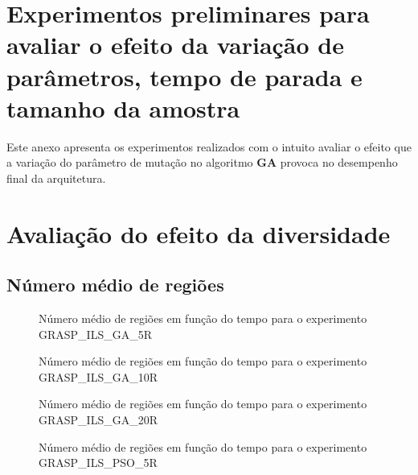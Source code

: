 \begin{apendicesenv}
\partapendices

\chapter{Experimentos preliminares para avaliar o efeito da variação de parâmetros, tempo de parada e tamanho da amostra}

Este anexo apresenta os experimentos realizados com o intuito avaliar o efeito que a variação do parâmetro de mutação no algoritmo \textbf{GA} provoca no desempenho final da arquitetura.

\chapter{Avaliação do efeito da diversidade}

\section{Número médio de regiões}
\label{app:numeroMedioRegioes}


\begin{figure}
    \centering
    \caption{Número médio de regiões em função do tempo para o experimento GRASP\_ILS\_GA\_5R}
    
    \label{grasp_ils_ga_5r}
\end{figure}

\begin{figure}
    \centering
    \caption{Número médio de regiões em função do tempo para o experimento GRASP\_ILS\_GA\_10R}
    
    \label{grasp_ils_ga_10R}
\end{figure}

\begin{figure}
    \centering
    \caption{Número médio de regiões em função do tempo para o experimento GRASP\_ILS\_GA\_20R}
    
    \label{grasp_ils_ga_20r}
\end{figure}


\begin{figure}
    \centering
    \caption{Número médio de regiões em função do tempo para o experimento GRASP\_ILS\_PSO\_5R}
    
\end{figure}


\end{apendicesenv}
